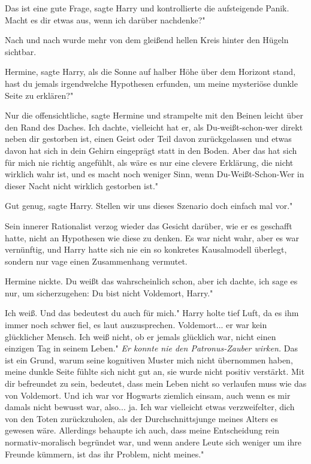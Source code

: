 \glqq{}Das ist eine gute Frage\grqq{}, sagte Harry und kontrollierte die
aufsteigende Panik. \glqq{}Macht es dir etwas aus, wenn ich darüber nachdenke?"

Nach und nach wurde mehr von dem gleißend hellen Kreis hinter den Hügeln
sichtbar.

\glqq{}Hermine\grqq{}, sagte Harry, als die Sonne auf halber Höhe über dem
Horizont stand, \glqq{}hast du jemals irgendwelche Hypothesen erfunden, um meine
mysteriöse dunkle Seite zu erklären?"

\glqq{}Nur die offensichtliche\grqq{}, sagte Hermine und strampelte mit den
Beinen leicht über den Rand des Daches. \glqq{}Ich dachte, vielleicht hat er, als
Du-weißt-schon-wer direkt neben dir gestorben ist, einen Geist oder Teil davon
zurückgelassen und etwas davon hat sich in dein Gehirn eingeprägt statt in den
Boden. Aber das hat sich für mich nie richtig angefühlt, als wäre es nur eine
clevere Erklärung, die nicht wirklich wahr ist, und es macht noch weniger Sinn,
wenn Du-Weißt-Schon-Wer in dieser Nacht nicht wirklich gestorben ist."

\glqq{}Gut genug\grqq{}, sagte Harry. \glqq{}Stellen wir uns dieses Szenario doch
einfach mal vor."

Sein innerer Rationalist verzog wieder das Gesicht darüber, wie er es geschafft
hatte, nicht an Hypothesen wie diese zu denken. Es war nicht wahr, aber es war
vernünftig, und Harry hatte sich nie ein so konkretes Kausalmodell überlegt,
sondern nur vage einen Zusammenhang vermutet.

Hermine nickte. \glqq{}Du weißt das wahrscheinlich schon, aber ich dachte, ich
sage es nur, um sicherzugehen: Du bist nicht Voldemort, Harry."

\glqq{}Ich weiß. Und das bedeutest du auch für mich." Harry holte tief Luft, da
es ihm immer noch schwer fiel, es laut auszusprechen. \glqq{}Voldemort... er war
kein glücklicher Mensch. Ich weiß nicht, ob er jemals glücklich war, nicht einen
einzigen Tag in seinem Leben."
\emph{Er konnte nie den Patronus-Zauber wirken.}
\glqq{}Das ist ein Grund, warum seine kognitiven Muster mich nicht übernommen
haben, meine dunkle Seite fühlte sich nicht gut an, sie wurde nicht positiv
verstärkt. Mit dir befreundet zu sein, bedeutet, dass mein Leben nicht so
verlaufen muss wie das von Voldemort. Und ich war vor Hogwarts ziemlich einsam,
auch wenn es mir damals nicht bewusst war, also... ja. Ich war vielleicht etwas
verzweifelter, dich von den Toten zurückzuholen, als der Durchschnittsjunge
meines Alters es gewesen wäre. Allerdings behaupte ich auch, dass meine
Entscheidung rein normativ-moralisch begründet war, und wenn andere Leute sich
weniger um ihre Freunde kümmern, ist das ihr Problem, nicht meines."

